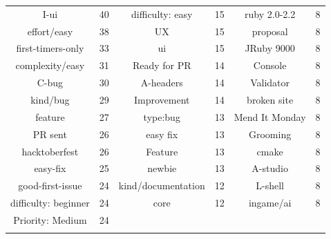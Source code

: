 \begin{table}[!b]
\begin{tabular}{ c | c || c | c || c | c }
        I-ui & 40 & difficulty: easy & 15 & ruby 2.0-2.2 & 8 \\
        effort/easy & 38 & UX & 15 & proposal & 8 \\
        first-timers-only & 33 & ui & 15 & JRuby 9000 & 8 \\
        complexity/easy & 31 & Ready for PR & 14 & Console & 8 \\
        C-bug & 30 & A-headers & 14 & Validator & 8 \\
        kind/bug & 29 & Improvement & 14 & broken site & 8 \\
        feature & 27 & type:bug & 13 & Mend It Monday & 8 \\
        PR sent & 26 & easy fix & 13 & Grooming & 8 \\
        hacktoberfest & 26 & Feature & 13 & cmake & 8 \\
        easy-fix & 25 & newbie & 13 & A-studio & 8 \\
        good-first-issue & 24 & kind/documentation & 12 & L-shell & 8 \\
        difficulty: beginner & 24 & core & 12 & ingame/ai & 8 \\
        Priority: Medium & 24 & & & & \\
        \Xhline{3\arrayrulewidth}
    \end{tabular}
\end{table}





